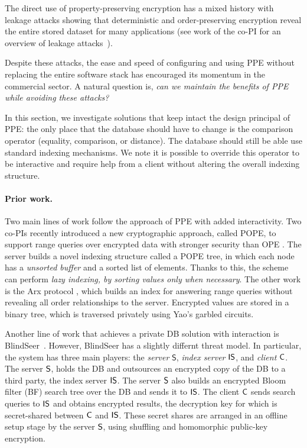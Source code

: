 
The direct use of property-preserving encryption has a mixed history
with leakage attacks showing that deterministic and order-preserving
encryption reveal the entire stored dataset for many applications (see
work of the co-PI for an overview of leakage
attacks~\cite{SP:FVYSHG17}).

Despite these attacks, the ease and speed of configuring and using PPE
without replacing the entire software stack has encouraged its momentum
in the commercial sector. A natural question is, \emph{can we maintain
the benefits of PPE while avoiding these attacks?}

In this section, we investigate solutions that keep intact
the design principal of PPE: the only place that the database should
have to change is the comparison operator (equality, comparison, or
distance).  The database should still be able use standard indexing
mechanisms.  We note it is possible to override this operator to be
interactive and require help from a client without altering the overall
indexing structure.

\paragraph{Prior work.}
Two main lines of work follow the approach of PPE with added
interactivity.  Two co-PIs recently introduced a new cryptographic
approach, called POPE, to support range queries over encrypted data with
stronger security than OPE \cite{CCS:RACY16}.
The server builds a novel indexing
structure called a POPE tree, in which each node has a {\it unsorted buffer}
and a sorted list of elements.  Thanks to this, the scheme can perform {\it
lazy indexing, by sorting values only when necessary}. 
%
The other work is the Arx protocol
\cite{EPRINT:PodBoePop16}, which builds an index for answering
range queries without revealing all order relationships to the server.
Encrypted values are stored in a binary tree, which is traversed
privately using Yao's garbled circuits.

Another line of work that achieves a private DB solution with interaction is
BlindSeer~\cite{SP:PKVKMC14,SP:FVKKKM15}. However, BlindSeer has a slightly
differnt threat model. In particular, the system has three main players: the
\emph{server} $\mathsf{S}$, {\em index server} $\sf IS$, and {\em client} $\sf
C$. The server $\sf S$, holds the DB and outsources an encrypted copy of the DB
to a third party, the index server $\sf IS$. The server $\sf S$  also builds an
encrypted Bloom filter (BF) search tree over the DB and sends it to $\sf IS$.
The client $\sf C$ sends search queries to $\sf IS$ and obtains encrypted
results, the decryption key for which is secret-shared between $\sf C$ and $\sf
IS$. These secret shares are arranged in an offline setup stage by the server
$\sf S$, using shuffling and homomorphic public-key encryption. 

